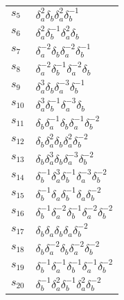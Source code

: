 \documentclass{article}
\begin{document}
\begin{center}
\begin{tabular}{ll}
$s_{5}$ & $\delta_a^{2}\delta_b^{}\delta_a^{2}\delta_b^{-1}$ \\
$s_{6}$ & $\delta_a^{2}\delta_b^{-1}\delta_a^{2}\delta_b^{}$ \\
$s_{7}$ & $\delta_a^{-2}\delta_b^{}\delta_a^{-2}\delta_b^{-1}$ \\
$s_{8}$ & $\delta_a^{-2}\delta_b^{-1}\delta_a^{-2}\delta_b^{}$ \\
$s_{9}$ & $\delta_a^{3}\delta_b^{}\delta_a^{-3}\delta_b^{-1}$ \\
$s_{10}$ & $\delta_a^{3}\delta_b^{-1}\delta_a^{-3}\delta_b^{}$ \\
$s_{11}$ & $\delta_b^{}\delta_a^{-1}\delta_b^{}\delta_a^{-1}\delta_b^{-2}$ \\
$s_{12}$ & $\delta_b^{}\delta_a^{2}\delta_b^{}\delta_a^{2}\delta_b^{-2}$ \\
$s_{13}$ & $\delta_b^{}\delta_a^{3}\delta_b^{}\delta_a^{-3}\delta_b^{-2}$ \\
$s_{14}$ & $\delta_b^{-1}\delta_a^{3}\delta_b^{-1}\delta_a^{-3}\delta_b^{-2}$ \\
$s_{15}$ & $\delta_b^{-1}\delta_a^{}\delta_b^{-1}\delta_a^{}\delta_b^{-2}$ \\
$s_{16}$ & $\delta_b^{-1}\delta_a^{-2}\delta_b^{-1}\delta_a^{-2}\delta_b^{-2}$ 
\\
$s_{17}$ & $\delta_b^{}\delta_a^{}\delta_b^{}\delta_a^{}\delta_b^{-2}$ \\
$s_{18}$ & $\delta_b^{}\delta_a^{-2}\delta_b^{}\delta_a^{-2}\delta_b^{-2}$ \\
$s_{19}$ & $\delta_b^{-1}\delta_a^{-1}\delta_b^{-1}\delta_a^{-1}\delta_b^{-2}$ 
\\
$s_{20}$ & $\delta_b^{-1}\delta_a^{2}\delta_b^{-1}\delta_a^{2}\delta_b^{-2}$ \\
\bottomrule
\end{tabular}
\end{center}

\thispagestyle{empty}
\end{document}
